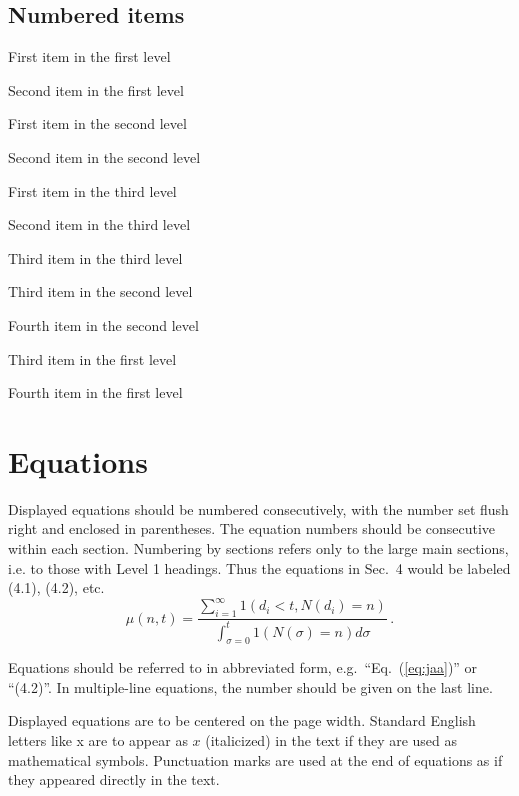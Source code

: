 \documentclass{ws-ijtaf}
\begin{document}
\subsection*{Numbered items}

\begin{arabiclist}
\item First item in the first level
\item Second item in the first level
\begin{alphlist}[(a)]
\item First item in the second level
\item Second item in the second level
\begin{romanlist}[iii.]
\item First item in the third level
\item Second item in the third level
\item Third item in the third level
\end{romanlist}
\item Third item in the second level
\item Fourth item in the second level
\end{alphlist}
\item Third item in the first level
\item Fourth item in the first level
\end{arabiclist}

\section{Equations}

Displayed equations should be numbered consecutively, with the number
set flush right and enclosed in parentheses. The equation numbers
should be consecutive within each section.  Numbering by sections
refers only to the large main sections, i.e. to those with Level 1
headings. Thus the equations in Sec.~4 would be labeled (4.1),
(4.2), etc.
\begin{equation}
\mu(n, t) = \frac{\sum^\infty_{i=1} 1(d_i < t, N(d_i)
= n)}{\int^t_{\sigma=0} 1(N(\sigma) = n)d\sigma}\,.
\label{eq:jaa}
\end{equation}

Equations should be referred to in abbreviated form,
e.g.~``Eq.~(\ref{eq:jaa})'' or ``(4.2)''. In multiple-line equations,
the number should be given on the last line.

Displayed equations are to be centered on the page width.  Standard
English letters like x are to appear as $x$ (italicized) in the text
if they are used as mathematical symbols. Punctuation marks are used
at the end of equations as if they appeared directly in the text.
\end{document}
